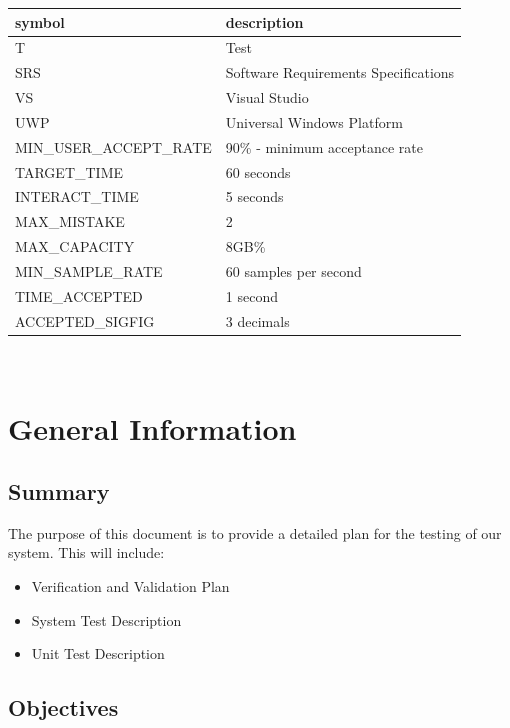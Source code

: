 \documentclass[12pt, titlepage]{article}
\begin{document}
\renewcommand{\arraystretch}{1.2}
\begin{tabular}{l l} 
  \toprule		
  \textbf{symbol} & \textbf{description}\\
  \midrule 
  T & Test\\
  SRS & Software Requirements Specifications \\
  VS & Visual Studio\\
  UWP & Universal Windows Platform\\
  MIN\_USER\_ACCEPT\_RATE & 90\% - minimum acceptance rate\\
  TARGET\_TIME & 60 seconds \\
  INTERACT\_TIME & 5 seconds \\
  MAX\_MISTAKE & 2 \\
  MAX\_CAPACITY & 8GB\% \\ 
  MIN\_SAMPLE\_RATE & 60 samples per second\\
  TIME\_ACCEPTED & 1 second \\
  ACCEPTED\_SIGFIG & 3 decimals \\
  \bottomrule
\end{tabular}\\


\newpage


\section{General Information}

\subsection{Summary}

The purpose of this document is to provide a detailed plan for the testing of our system. This will include:
\begin{itemize}
  \item Verification and Validation Plan
  \item System Test Description
  \item Unit Test Description
\end{itemize}

\subsection{Objectives}
\end{document}
